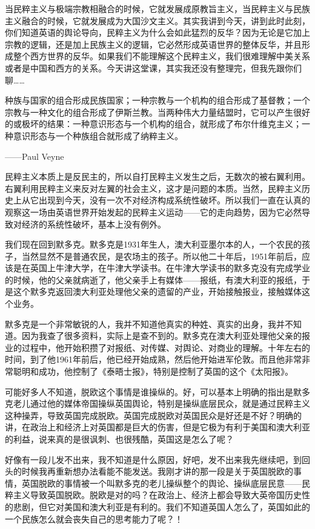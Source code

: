 \documentclass[UTF8, 12pt, a4paper]{ctexrep}
\begin{document}
当民粹主义与极端宗教相融合的时候，它就发展成原教旨主义，当民粹主义与民族主义融合的时候，它就发展成为大国沙文主义。其实我讲到今天，讲到此时此刻，你们知道英语的舆论导向，民粹主义为什么会如此猛烈的反华？因为无论是它加上宗教的逻辑，还是加上民族主义的逻辑，它必然形成英语世界的整体反华，并且形成整个西方世界的反华。如果我们不能理解这个民粹主义，我们很难理解中美关系或者是中国和西方的关系。今天讲这堂课，其实我还没有整理完，但我先跟你们聊……

{\kaishu 种族与国家的组合形成民族国家；一种宗教与一个机构的组合形成了基督教；一个宗教与一种文化的组合形成了伊斯兰教。当两种伟大力量结盟时，它可以产生很好的或极坏的结果：一种意识形态与一个机构的组合，就形成了布尔什维克主义；一种意识形态与一个种族组合就形成了纳粹主义。

——Paul Veyne}

民粹主义本质上是反民主的，所以自打民粹主义发生之后，无数次的被右翼利用。右翼利用民粹主义来反对左翼的社会主义，这才是问题的本质。当然，民粹主义历史上从它出现到今天，没有一次不对经济构成系统性破坏。所以我们一直在认真的观察这一场由英语世界开始发起的民粹主义运动——它的走向趋势，因为它必然导致对经济的系统性破坏，基本上没有例外。

我们现在回到默多克。默多克是1931年生人，澳大利亚墨尔本的人，一个农民的孩子，当然显然不是普通农民，是农场主的孩子。所以他二十年后，1951年前后，应该是在英国上牛津大学，在牛津大学读书。在牛津大学读书的默多克没有完成学业的时候，他的父亲就病逝了，他父亲手上有媒体——报纸，有澳大利亚的报纸，于是这个默多克返回澳大利亚处理他父亲的遗留的产业，开始接触报业，接触媒体这个业务。

默多克是一个非常敏锐的人，我并不知道他真实的种姓、真实的出身，我并不知道。因为我查了很多资料，实际上是查不到的。默多克在澳大利亚处理他父亲的报业的过程中，他开始积攒了对报纸、对传媒、对舆论、对商业的理解。十年左右的时间，到了他1961年前后，他已经开始成熟，然后他开始进军伦敦。而且他非常非常聪明和成功，他控制了《泰晤士报》，特别是控制了英国的这个《太阳报》。

可能好多人不知道，脱欧这个事情是谁操纵的。好，可以基本上明确的指出是默多克老儿通过他的媒体帝国操纵英国舆论，特别是操纵底层民众，就是通过民粹主义这种操弄，导致英国完成脱欧。英国完成脱欧对英国民众是好还是不好？明确的讲，在政治上和经济上对英国都是巨大的伤害，但是它极为有利于美国和澳大利亚的利益，说来真的是很讽刺、也很残酷，英国这是怎么了呢？

好像有一段儿发不出来，我不知道是什么原因，好吧，发不出来我先继续吧，到回头的时候我再重新想办法看能不能发送。我刚才讲的那一段是关于英国脱欧的事情，英国脱欧的事情被一个叫默多克的老儿操纵整个的舆论、操纵底层民意——民粹主义导致英国脱欧。脱欧是对的吗？在政治上、经济上都会导致大英帝国历史性的悲剧，但它对美国和澳大利亚是有利的。我们不知道英国人怎么了，英国如此的一个民族怎么就会丧失自己的思考能力了呢？！
\end{document}
